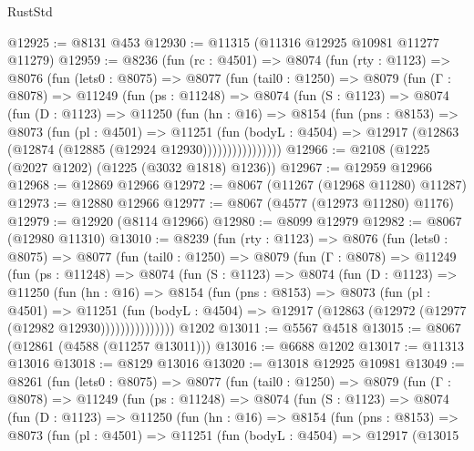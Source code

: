 \begin{lexlean}{RustStd}
\begin{coremodule}
@12925 := @8131 @453
@12930 := @11315 (@11316 @12925 @10981 @11277 @11279)
@12959 := @8236
    (fun (rc : @4501) =>
    @8074
      (fun (rty : @1123) =>
      @8076
        (fun (lets0 : @8075) =>
        @8077
          (fun (tail0 : @1250) =>
          @8079
            (fun (Γ : @8078) =>
            @11249
              (fun (ps : @11248) =>
              @8074
                (fun (S : @1123) =>
                @8074
                  (fun (D : @1123) =>
                  @11250
                    (fun (hn : @16) =>
                    @8154
                      (fun (pns : @8153) =>
                      @8073
                        (fun (pl : @4501) =>
                        @11251
                          (fun (bodyL : @4504) =>
                          @12917 (@12863 (@12874 (@12885 (@12924 @12930))))))))))))))))
@12966 := @2108 (@1225 (@2027 @1202) (@1225 (@3032 @1818) @1236))
@12967 := @12959 @12966
@12968 := @12869 @12966
@12972 := @8067 (@11267 (@12968 @11280) @11287)
@12973 := @12880 @12966
@12977 := @8067 (@4577 (@12973 @11280) @1176)
@12979 := @12920 (@8114 @12966)
@12980 := @8099 @12979
@12982 := @8067 (@12980 @11310)
@13010 := @8239
    (fun (rty : @1123) =>
    @8076
      (fun (lets0 : @8075) =>
      @8077
        (fun (tail0 : @1250) =>
        @8079
          (fun (Γ : @8078) =>
          @11249
            (fun (ps : @11248) =>
            @8074
              (fun (S : @1123) =>
              @8074
                (fun (D : @1123) =>
                @11250
                  (fun (hn : @16) =>
                  @8154
                    (fun (pns : @8153) =>
                    @8073
                      (fun (pl : @4501) =>
                      @11251
                        (fun (bodyL : @4504) =>
                        @12917 (@12863 (@12972 (@12977 (@12982 @12930)))))))))))))))
    @1202
@13011 := @5567 @4518
@13015 := @8067 (@12861 (@4588 (@11257 @13011)))
@13016 := @6688 @1202
@13017 := @11313 @13016
@13018 := @8129 @13016
@13020 := @13018 @12925 @10981
@13049 := @8261
    (fun (lets0 : @8075) =>
    @8077
      (fun (tail0 : @1250) =>
      @8079
        (fun (Γ : @8078) =>
        @11249
          (fun (ps : @11248) =>
          @8074
            (fun (S : @1123) =>
            @8074
              (fun (D : @1123) =>
              @11250
                (fun (hn : @16) =>
                @8154
                  (fun (pns : @8153) =>
                  @8073
                    (fun (pl : @4501) =>
                    @11251
                      (fun (bodyL : @4504) =>
                      @12917
                        (@13015

\end{coremodule}
\end{lexlean}
